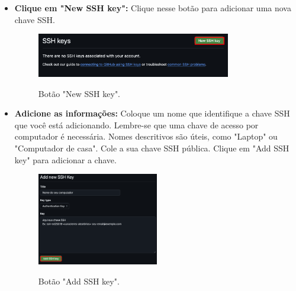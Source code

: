 \begin{itemize}
\item \textbf{Clique em "New SSH key":}
Clique nesse botão para adicionar uma nova chave SSH.

    \begin{figure}[H]
\centering
\includegraphics[width=0.8\textwidth]{imgs/tutorial_criar_conta_github/9_new_ssh_key.png}
\label{fig:ssh_keys}
\caption{Botão "New SSH key".}
\end{figure}

\item \textbf{Adicione as informações:}
    Coloque um nome que identifique a chave SSH que você está adicionando. Lembre-se que uma chave de acesso por computador é necessária. Nomes descritivos são úteis, como "Laptop" ou "Computador de casa". Cole a sua chave SSH pública. Clique em "Add SSH key" para adicionar a chave.

    \begin{figure}[H]
\centering
\includegraphics[width=0.5\textwidth]{imgs/tutorial_criar_conta_github/10_add_ssh_key.png}
\label{fig:ssh_keys}
\caption{Botão "Add SSH key".}
\end{figure}

\end{itemize}



